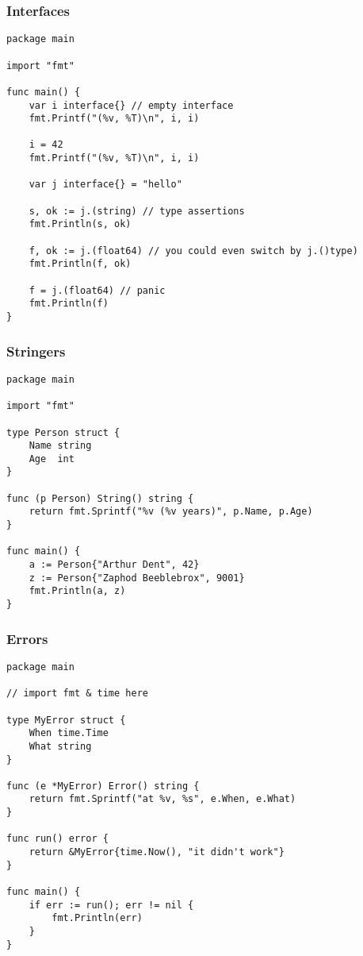 \begin{frame}[fragile]
\frametitle{Interfaces}

\begin{lstlisting}
package main

import "fmt"

func main() {
    var i interface{} // empty interface
    fmt.Printf("(%v, %T)\n", i, i)

    i = 42
    fmt.Printf("(%v, %T)\n", i, i)

    var j interface{} = "hello"

    s, ok := j.(string) // type assertions
    fmt.Println(s, ok)

    f, ok := j.(float64) // you could even switch by j.()type)
    fmt.Println(f, ok)

    f = j.(float64) // panic
    fmt.Println(f)
}
\end{lstlisting}
\end{frame}


\begin{frame}[fragile]
\frametitle{Stringers}

\begin{lstlisting}
package main

import "fmt"

type Person struct {
    Name string
    Age  int
}

func (p Person) String() string {
    return fmt.Sprintf("%v (%v years)", p.Name, p.Age)
}

func main() {
    a := Person{"Arthur Dent", 42}
    z := Person{"Zaphod Beeblebrox", 9001}
    fmt.Println(a, z)
}
\end{lstlisting}
\end{frame}


\begin{frame}[fragile]
\frametitle{Errors}

\begin{lstlisting}
package main

// import fmt & time here

type MyError struct {
    When time.Time
    What string
}

func (e *MyError) Error() string {
    return fmt.Sprintf("at %v, %s", e.When, e.What)
}

func run() error {
    return &MyError{time.Now(), "it didn't work"}
}

func main() {
    if err := run(); err != nil {
        fmt.Println(err)
    }
}
\end{lstlisting}
\end{frame}


